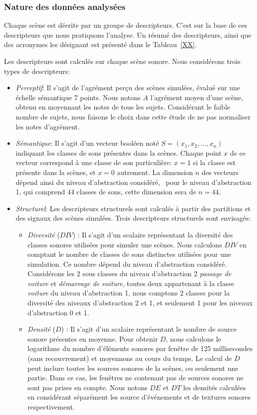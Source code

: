 \subsubsection{Nature des données analysées}

Chaque scène est décrite par un groupe de descripteurs. C'est sur la base de ces descripteurs que nous pratiquons l'analyse. Un résumé des descripteurs, ainsi que des acronymes les désignant est présenté dans le Tableau~\ref{XX}.

Les descripteurs sont calculés sur chaque scène sonore. Nous considérons trois types de descripteurs:

\begin{itemize}
\item \emph{Perceptif}: Il s'agit de l'agrément perçu des scènes simulées, évalué sur une échelle sémantique 7 points. Nous notons $A$ l'agrément moyen d'une scène, obtenu en moyennant les notes de tous les sujets. Considérant le faible nombre de sujets, nous faisons le choix dans cette étude de ne pas normaliser les notes d'agrément.
\item \emph{Sémantique}: Il s'agit d'un vecteur booléen noté $S=(x_1,x_2,\ldots,x_n)$ indiquant les classes de sons présentes dans la scènes. Chaque point $x$ de ce vecteur correspond à une classe de son particulière: $x=1$ si la classe est présente dans la scènes, et $x=0$ autrement. La dimension $n$ des vecteurs dépend ainsi du niveau d'abstraction considéré, \eg~pour le niveau d'abstraction 1, qui comprend $44$ classes de sons, cette dimension sera de $n=44$.
\item \emph{Structurel}: Les descripteurs structurels sont calculés à partir des partitions et des signaux des scènes simulées. Trois descripteurs structurels sont envisagés:
\begin{itemize}
\item \emph{Diversité} ($DIV$) : Il s'agit d'un scalaire représentant la diversité des classes sonores utilisées pour simuler une scènes. Nous calculons $DIV$ en comptant le nombre de classes de sons distinctes utilisées pour une simulation. Ce nombre dépend du niveau d'abstraction considéré. Considérons les 2 sous classes du niveau d'abstraction 2 \emph{passage de voiture} et \emph{démarrage de voiture}, toutes deux appartenant à la classe \emph{voiture} du niveau d'abstraction 1, nous comptons 2 classes pour la diversité des niveaux d'abstraction 2 et 1, et seulement 1 pour les niveaux d'abstraction 0 et 1.
\item \emph{Densité} ($D$) : Il s'agit d'un scalaire représentant le nombre de source sonore présentes en moyenne. Pour obtenir $D$, nous calculons le logarithme du nombre d'éléments sonores par fenêtre de 125 millisecondes (sans recouvrement) et moyennons au cours du temps. Le calcul de $D$ peut inclure toutes les sources sonores de la scènes, ou seulement une partie. Dans ce cas, les fenêtres ne contenant pas de sources sonores ne sont pas prises en compte. Nous notons $DE$ et $DT$ les densités calculées en considérant séparément les source d'événements et de textures sonores respectivement.

\end{itemize}
\end{itemize}
